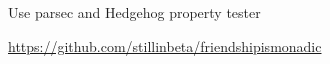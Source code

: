 \documentclass[letterpaper,11pt,notitlepage]{article}
\begin{document}
          \begin{employment}
          \item Use parsec and Hedgehog property tester
          \item \url{https://github.com/stillinbeta/friendshipismonadic}
          \end{employment}
\end{document}
